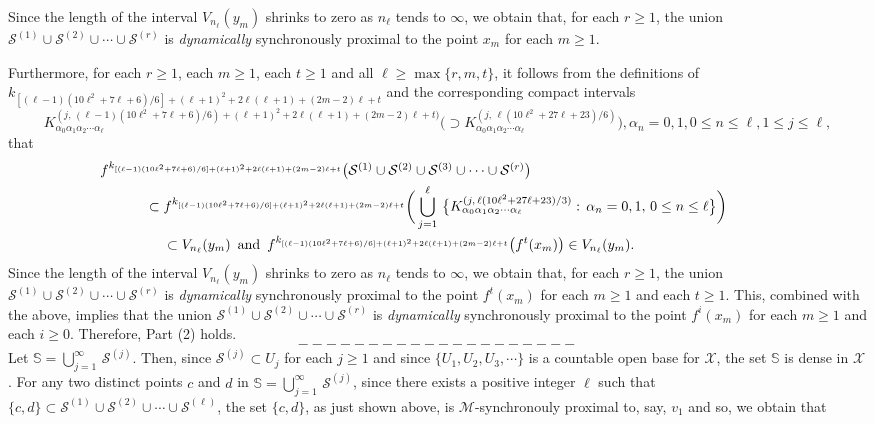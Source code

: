 \documentclass[12pt]{article}
\newcommand{\al}{\alpha}
\begin{document}
\indent Since the length of the interval $V_{n_\ell}(y_m)$ shrinks to zero as $n_\ell$ tends to $\infty$, we obtain that, for each $r \ge 1$, the union $\mathcal S^{(1)} \cup \mathcal S^{(2)} \cup \cdots \cup \mathcal S^{(r)}$ is {\it dynamically} synchronously proximal to the point $x_m$ for each $m \ge 1$.  

Furthermore, for each $r \ge 1$, each $m \ge 1$, each $t \ge 1$ and all $\ell \ge \max \{ r, m, t \}$, it follows from the definitions of 
$k_{[(\ell-1)(10\ell^2+7\ell+6)/6]+(\ell+1)^2+2\ell(\ell+1)+(2m-2)\ell+t}$ and the corresponding compact intervals 
$$
K_{\al_0\al_1\al_2\cdots\al_\ell}^{(j, \, (\ell-1)(10\ell^2+7\ell+6)/6)+(\ell+1)^2+2\ell(\ell+1)+(2m-2)\ell+t)} \big(\supset K_{\al_0\al_1\al_2\cdots\al_\ell}^{(j, \, \ell(10\ell^2+27\ell+23)/6)}\big), \al_n = 0, 1, 0 \le n \le \ell, 1 \le j \le \ell, 
$$
that
\begin{multline*}
$$
\,\,\, f^{k_{[(\ell-1)(10\ell^2+7\ell+6)/6]+(\ell+1)^2+2\ell(\ell+1)+(2m-2)\ell+t}}\big(\mathcal S^{(1)} \cup \mathcal S^{(2)} \cup \mathcal S^{(3)} \cup \cdots \cup \mathcal S^{(r)}\big) \qquad\qquad\qquad\qquad\qquad\qquad\qquad\quad\quad\quad\quad \\
\subset f^{k_{[(\ell-1)(10\ell^2+7\ell+6)/6]+(\ell+1)^2+2\ell(\ell+1)+(2m-2)\ell+t}}\bigg(\bigcup_{j=1}^\ell \, \big\{ K_{\al_0\al_1\al_2\cdots\al_\ell}^{(j, \, \ell(10\ell^2+27\ell+23)/3)}: \, \al_n = 0, 1, \, 0 \le n \le \ell \big\}\bigg) \\ 
\qquad\,\,\,\, \subset V_{n_\ell}(y_m) \,\,\, \text{and} \,\,\, f^{k_{[(\ell-1)(10\ell^2+7\ell+6)/6]+(\ell+1)^2+2\ell(\ell+1)+(2m-2)\ell+t}}\big(f^t(x_m)\big) \in V_{n_\ell}(y_m). \qquad\qquad\qquad\quad\quad
$$
\end{multline*}
\indent Since the length of the interval $V_{n_\ell}(y_m)$ shrinks to zero as $n_\ell$ tends to $\infty$, we obtain that, for each $r \ge 1$, the union $\mathcal S^{(1)} \cup \mathcal S^{(2)} \cup \cdots \cup \mathcal S^{(r)}$ is {\it dynamically} synchronously proximal to the point $f^t(x_m)$ for each $m \ge 1$ and each $t \ge 1$.  This, combined with the above, implies that the union $\mathcal S^{(1)} \cup \mathcal S^{(2)} \cup \cdots \cup \mathcal S^{(r)}$ is {\it dynamically} synchronously proximal to the point $f^i(x_m)$ for each $m \ge 1$ and each $i \ge 0$.  Therefore, Part (2) holds.   
$$--------------------$$
\indent Let $\mathbb S = \bigcup_{j=1}^\infty \, \mathcal S^{(j)}$.  Then, since $\mathcal S^{(j)} \subset U_j$ for each $j \ge 1$ and since $\{U_1, U_2, U_3, \cdots \}$ is a countable open base for $\mathcal X$, the set $\mathbb S$ is dense in $\mathcal X$.  For any two distinct points $c$ and $d$ in $\mathbb S = \bigcup_{j=1}^\infty \, \mathcal S^{(j)}$, since there exists a positive integer $\ell$ such that $\{ c, d \} \subset \mathcal S^{(1)} \cup \mathcal S^{(2)} \cup \cdots \cup \mathcal S^{(\ell)}$, the set $\{ c, d \}$, as just shown above, is $\mathcal M$-synchronouly proximal to, say, $v_1$ and so, we obtain that 
\end{document}
